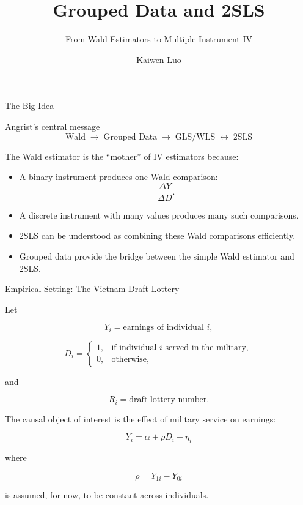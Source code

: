 \documentclass[aspectratio=169]{beamer}
\title{Grouped Data and 2SLS}
\subtitle{From Wald Estimators to Multiple-Instrument IV}
\author{Kaiwen Luo}
\institute{Washington University in St. Louis}
\date{}
\begin{document}

\begin{frame}
    \titlepage
\end{frame}

\begin{frame}{The Big Idea}

\begin{block}{Angrist's central message}
\[
\boxed{
\text{Wald}
\;\longrightarrow\;
\text{Grouped Data}
\;\longrightarrow\;
\text{GLS/WLS}
\;\longleftrightarrow\;
\text{2SLS}
}
\]
\end{block}

\vspace{0.3cm}

The Wald estimator is the ``mother'' of IV estimators because:

\begin{itemize}
    \item A binary instrument produces one Wald comparison:
    \[
    \frac{\Delta Y}{\Delta D}.
    \]

    \item A discrete instrument with many values produces many such comparisons.

    \item 2SLS can be understood as combining these Wald comparisons efficiently.

    \item Grouped data provide the bridge between the simple Wald estimator and 2SLS.
\end{itemize}

\end{frame}

\begin{frame}{Empirical Setting: The Vietnam Draft Lottery}

Let

\[
Y_i = \text{earnings of individual } i,
\]

\[
D_i =
\begin{cases}
1, & \text{if individual }i\text{ served in the military},\\
0, & \text{otherwise},
\end{cases}
\]

and

\[
R_i = \text{draft lottery number}.
\]

\vspace{0.3cm}

The causal object of interest is the effect of military service on earnings:

\[
\boxed{
Y_i = \alpha + \rho D_i + \eta_i
}
\]

where

\[
\rho = Y_{1i}-Y_{0i}
\]

is assumed, for now, to be constant across individuals.

\end{frame}
\end{document}
